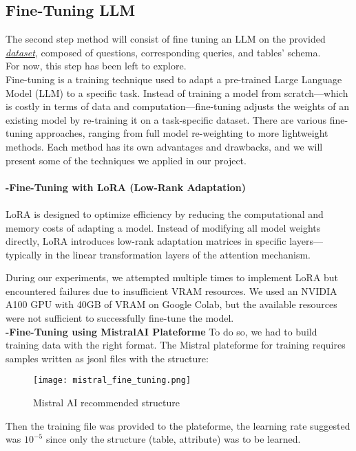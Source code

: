 \documentclass[12pt,a4paper]{article}
\begin{document}
\subsection*{Fine-Tuning LLM}
The second step method will consist of fine tuning an LLM on the provided \textit{\href{https://huggingface.co/datasets/richardr1126/spider-schema/viewer?row=1}{dataset}}, composed of questions, corresponding queries, and tables' schema.
\\
For now, this step has been left to explore.
\\
Fine-tuning is a training technique used to adapt a pre-trained Large Language Model (LLM) to a specific task. Instead of training a model from scratch—which is costly in terms of data and computation—fine-tuning adjusts the weights of an existing model by re-training it on a task-specific dataset. There are various fine-tuning approaches, ranging from full model re-weighting to more lightweight methods. Each method has its own advantages and drawbacks, and we will present some of the techniques we applied in our project.\\
\\
\textbf{-Fine-Tuning with LoRA (Low-Rank Adaptation)}\\
\\
LoRA is designed to optimize efficiency by reducing the computational and memory costs of adapting a model. Instead of modifying all model weights directly, LoRA introduces low-rank adaptation matrices in specific layers—typically in the linear transformation layers of the attention mechanism.

During our experiments, we attempted multiple times to implement LoRA but encountered failures due to insufficient VRAM resources. We used an NVIDIA A100 GPU with 40GB of VRAM on Google Colab, but the available resources were not sufficient to successfully fine-tune the model.
\\
\textbf{-Fine-Tuning using MistralAI Plateforme}
To do so, we had to build training data with the right format. The Mistral plateforme for training requires samples written as jsonl files with the structure:
\begin{figure}
    \centering
    \texttt{[image: mistral\_fine\_tuning.png]}
    \caption{Mistral AI recommended structure}
    \label{fig:enter-label}
\end{figure}
Then the training file was provided to the plateforme, the learning rate suggested was $10^{-5}$ since only the structure (table, attribute) was to be learned.
\end{document}
